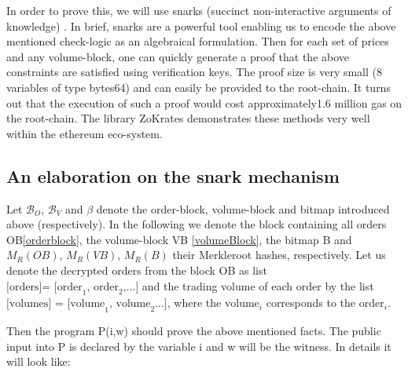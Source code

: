 \documentclass[11pt,parskip=full]{scrartcl}%
\begin{document}
In order to prove this, we will use snarks (succinct non-interactive arguments of knowledge) \cite{snarks}. 
In brief, snarks are a powerful tool enabling us to encode the above mentioned check-logic as an algebraical formulation. 
Then for each set of prices and any volume-block, one can quickly generate a proof that the above constraints are satisfied using verification keys. 
The proof size is very small (8 variables of type bytes64) and can easily be provided to the root-chain. 
It turns out that the execution of such a proof would cost approximately1.6 million gas on the root-chain. 
The library ZoKrates \cite{zokrates} demonstrates these methods very well within the ethereum eco-system. 

\subsection*{An elaboration on the snark mechanism}
Let $\mathcal{B}_O$, $\mathcal{B}_V$ and $\beta$ denote the order-block, volume-block and bitmap introduced above (respectively). 
In the following we denote the block containing all orders OB\ref{orderblock}, the volume-block VB \ref{volumeBlock}, the bitmap B and $M_R(OB)$, $M_R(VB)$, $M_R(B)$ their Merkleroot hashes, respectively.
Let us denote the decrypted orders from the block OB as list $\text{[orders]= [order}_1\text{, order}_2\text{,...]}$ and the trading volume of each order by the list $\text{[volumes] = [volume}_1\text{, volume}_2\text{...]}$, where the $\text{volume}_i$ corresponds to the $\text{order}_i$. 


Then the program P(i,w) should prove the above mentioned facts. 
The public input into P is declared by the variable i and w will be the witness. 
In details it will look like:
\end{document}
